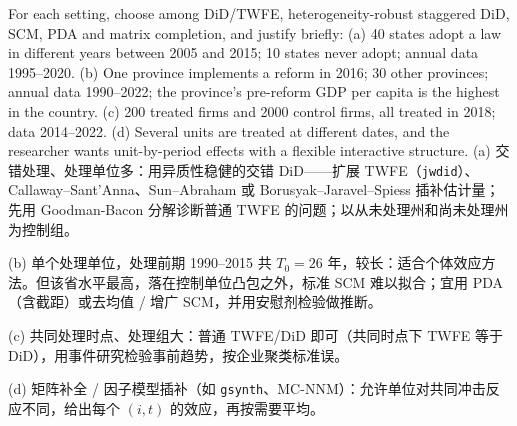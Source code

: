 \begin{prac}
For each setting, choose among DiD/TWFE, heterogeneity-robust staggered DiD, SCM, PDA and matrix completion, and justify briefly: (a) 40 states adopt a law in different years between 2005 and 2015; 10 states never adopt; annual data 1995--2020. (b) One province implements a reform in 2016; 30 other provinces; annual data 1990--2022; the province's pre-reform GDP per capita is the highest in the country. (c) 200 treated firms and 2000 control firms, all treated in 2018; data 2014--2022. (d) Several units are treated at different dates, and the researcher wants unit-by-period effects with a flexible interactive structure.
\answer
(a) 交错处理、处理单位多：用异质性稳健的交错 DiD——扩展 TWFE（\texttt{jwdid}）、Callaway--Sant'Anna、Sun--Abraham 或 Borusyak--Jaravel--Spiess 插补估计量；先用 Goodman-Bacon 分解诊断普通 TWFE 的问题；以从未处理州和尚未处理州为控制组。

(b) 单个处理单位，处理前期 1990--2015 共 $T_0=26$ 年，较长：适合个体效应方法。但该省水平最高，落在控制单位凸包之外，标准 SCM 难以拟合；宜用 PDA（含截距）或去均值 / 增广 SCM，并用安慰剂检验做推断。

(c) 共同处理时点、处理组大：普通 TWFE/DiD 即可（共同时点下 TWFE 等于 DiD），用事件研究检验事前趋势，按企业聚类标准误。

(d) 矩阵补全 / 因子模型插补（如 \texttt{gsynth}、MC-NNM）：允许单位对共同冲击反应不同，给出每个 $(i,t)$ 的效应，再按需要平均。
\end{prac}
